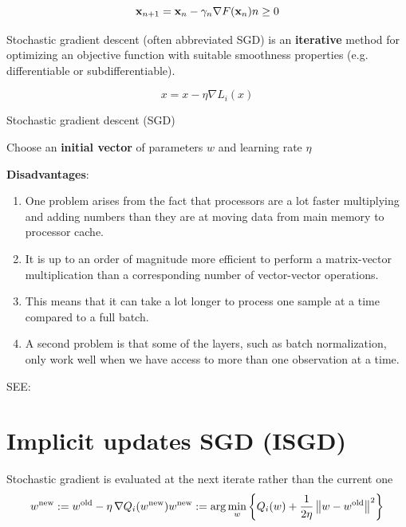 \[
    \displaystyle \mathbf {x} _{n+1}=\mathbf {x} _{n}-\gamma _{n}\nabla F(\mathbf {x} _{n}) \hfill n\geq 0
\]


Stochastic gradient descent (often abbreviated SGD) is an \textbf{iterative} method for optimizing an objective function with suitable smoothness properties (e.g. differentiable or subdifferentiable).

\[
    \displaystyle x = x - \eta\nabla L_{i}(x)
\]

\begin{algorithm}
    \caption{Stochastic gradient descent (SGD)}
    
    Choose an \textbf{initial vector} of parameters ${\displaystyle w}$ and learning rate ${\displaystyle \eta }$

\end{algorithm}

\textbf{Disadvantages}:
\begin{enumerate}[itemsep=0.2cm]
    \item One problem arises from the fact that processors are a lot faster multiplying and adding numbers than they are at moving data from main memory to processor cache. 
    
    \item It is up to an order of magnitude more efficient to perform a matrix-vector multiplication than a corresponding number of vector-vector operations. 
    
    \item This means that it can take a lot longer to process one sample at a time compared to a full batch. 
    
    \item A second problem is that some of the layers, such as batch normalization, only work well when we have access to more than one observation at a time.

\end{enumerate}

\noindent
SEE: 





\section{Implicit updates SGD (ISGD)}\label{Implicit updates SGD (ISGD)}
Stochastic gradient is evaluated at the next iterate rather than the current one
\[
    {\displaystyle w^{\text{new}}:=w^{\text{old}}-\eta \,\nabla Q_{i}(w^{\rm {new}})} 
    \hfill 
    {\displaystyle w^{\text{new}}:=\arg \min _{w}\dCurlyBrac{Q_{i}(w)+{\frac {1}{2\eta }}\dnorm{w-w^{\text{old}}}^{2}}}
\]


